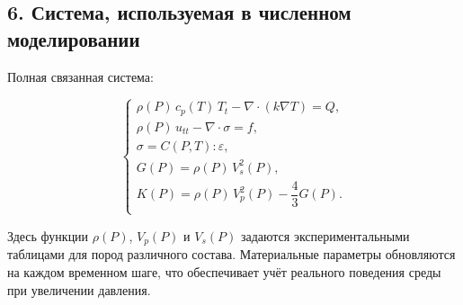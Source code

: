 \subsection*{6. Система, используемая в численном моделировании}

Полная связанная система:

\[
\begin{cases}
\rho(P)\, c_p(T)\, T_t - \nabla \cdot (k \nabla T) = Q,\\[6pt]
\rho(P)\, u_{tt} - \nabla \cdot \sigma = f,\\[6pt]
\sigma = C(P,T) : \varepsilon,\\[6pt]
G(P) = \rho(P)\, V_s^2(P),\\[4pt]
K(P) = \rho(P)\, V_p^2(P) - \dfrac{4}{3} G(P).\\
\end{cases}
\]

Здесь функции $\rho(P)$, $V_p(P)$ и $V_s(P)$ задаются 
экспериментальными таблицами для пород различного состава.
Материальные параметры обновляются на каждом временном шаге,
что обеспечивает учёт реального поведения среды при увеличении давления.
